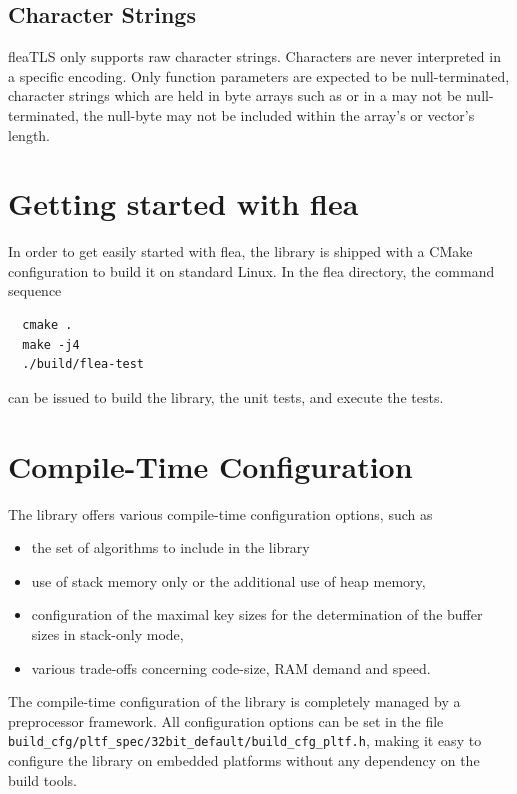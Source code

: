 \documentclass[a4paper,11pt]{scrartcl}
\begin{document}
  \subsection{Character Strings}

  fleaTLS only supports raw character strings. Characters are never interpreted in 
  a specific encoding. Only  function parameters are expected to be
  null-terminated, character strings which are held in byte arrays such as
   or in a  may not be
  null-terminated, \ie the null-byte may not be included within the array's or
  vector's length.

\section{Getting started with flea}

  In order to get easily started with flea, the library is shipped with a CMake
  configuration to build it on standard Linux. In the
  flea directory, the command sequence 
  \begin{verbatim}
  cmake .
  make -j4
  ./build/flea-test
  \end{verbatim}
  can be issued to build the library, the unit tests, and execute the tests.

  \section{Compile-Time Configuration}

The library offers various compile-time
configuration options, such as 
\begin{itemize}
  \item the set of algorithms to include in the library
  \item use of stack memory only or the additional use of heap memory,
  \item configuration of the maximal key sizes for the determination of the
    buffer sizes in stack-only mode,
  \item various trade-offs concerning code-size, RAM demand and speed.
  \end{itemize}

  The compile-time configuration of the library is completely managed by a
  preprocessor framework. All configuration options can be set in the file
  \verb#build_cfg/pltf_spec/32bit_default/build_cfg_pltf.h#, making it easy to configure the
  library on embedded platforms without any dependency on the build tools.
\end{document}
